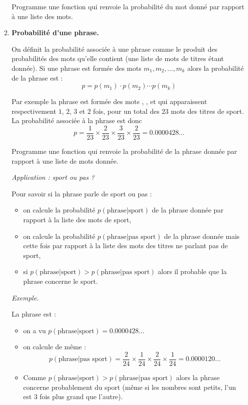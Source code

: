 \documentclass[11pt,class=report,crop=false]{standalone}
\begin{document}
\begin{activite}
\begin{enumerate}
	Programme une fonction  qui renvoie la probabilité du mot donné par rapport à une liste des mots.
	
		
 	\item \textbf{Probabilité d'une phrase.}
 	
 	On définit la probabilité associée à une phrase	comme le produit des probabilités des mots qu'elle contient (une liste de mots de titres étant donnée). 
 	Si une phrase est formée des mots $m_1, m_2,\ldots,m_k$ alors la probabilité de la phrase est :
 	$$p = p(m_1) \cdot p(m_2) \cdots p(m_k)$$
 	
 	Par exemple la phrase  est formée des mots ,
 	,  et  qui apparaissent respectivement $1$, $2$, $3$ et $2$ fois, pour un total des $23$ mots des titres de sport. La probabilité associée à la phrase est donc
 	$$p = \frac{1}{23} \times \frac{2}{23} \times \frac{3}{23} \times \frac{2}{23} = 0.0000428\ldots$$

 	Programme une fonction  qui renvoie la probabilité de la phrase donnée par rapport à une liste de mots donnée.
 	
 	\medskip
 	
 	\emph{Application : sport ou pas ?}
 	
 	Pour savoir si la phrase  parle de sport ou pas :
 	\begin{itemize}
 		\item on calcule la probabilité $p(\text{phrase}|\text{sport})$ de la phrase donnée par rapport à la liste des mots de sport,
 		\item  on calcule la probabilité $p(\text{phrase}|\text{pas sport})$ de la phrase donnée mais cette fois par rapport à la liste des mots des titres ne parlant pas de sport,
 		\item si $p(\text{phrase}|\text{sport}) > p(\text{phrase}|\text{pas sport})$ alors il probable que la phrase concerne le sport. 
 	\end{itemize}
 	
	\medskip 
	
 	\emph{Exemple.}
 	
 	La phrase est  :
	\begin{itemize} 
		\item on a vu $p(\text{phrase}|\text{sport}) = 0.0000428\ldots$
		\item on calcule de même :
		$$p(\text{phrase}|\text{pas sport}) = \frac{2}{24} \times \frac{1}{24} \times \frac{2}{24} \times \frac{1}{24} = 0.0000120\ldots$$
        \item Comme $p(\text{phrase}|\text{sport}) > p(\text{phrase}|\text{pas sport})$ alors la phrase concerne probablement du sport (même si les nombres sont petits, l'un est $3$ fois plus grand que l'autre).
       \end{itemize}		
	

\end{enumerate}
\end{activite}
\end{document}
